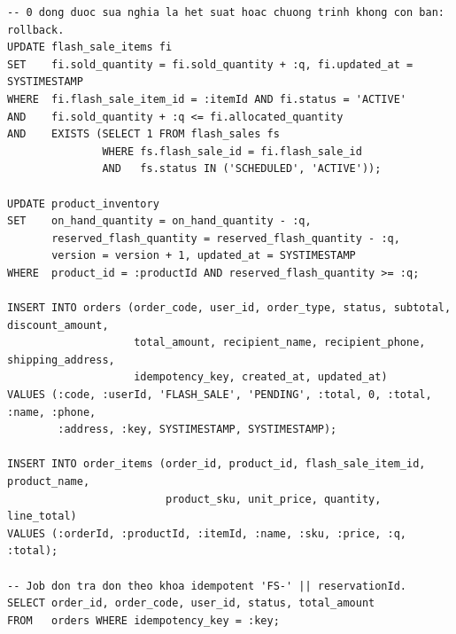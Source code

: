 \reportblockspace{72pt}
\begin{lstlisting}[language=OracleSQL, caption={Đặt đơn: tăng số đã bán và xuất kho bằng UPDATE có điều kiện trong một transaction}, label={lst:cc-dat-don}]
-- 0 dong duoc sua nghia la het suat hoac chuong trinh khong con ban: rollback.
UPDATE flash_sale_items fi
SET    fi.sold_quantity = fi.sold_quantity + :q, fi.updated_at = SYSTIMESTAMP
WHERE  fi.flash_sale_item_id = :itemId AND fi.status = 'ACTIVE'
AND    fi.sold_quantity + :q <= fi.allocated_quantity
AND    EXISTS (SELECT 1 FROM flash_sales fs
               WHERE fs.flash_sale_id = fi.flash_sale_id
               AND   fs.status IN ('SCHEDULED', 'ACTIVE'));

UPDATE product_inventory
SET    on_hand_quantity = on_hand_quantity - :q,
       reserved_flash_quantity = reserved_flash_quantity - :q,
       version = version + 1, updated_at = SYSTIMESTAMP
WHERE  product_id = :productId AND reserved_flash_quantity >= :q;

INSERT INTO orders (order_code, user_id, order_type, status, subtotal, discount_amount,
                    total_amount, recipient_name, recipient_phone, shipping_address,
                    idempotency_key, created_at, updated_at)
VALUES (:code, :userId, 'FLASH_SALE', 'PENDING', :total, 0, :total, :name, :phone,
        :address, :key, SYSTIMESTAMP, SYSTIMESTAMP);

INSERT INTO order_items (order_id, product_id, flash_sale_item_id, product_name,
                         product_sku, unit_price, quantity, line_total)
VALUES (:orderId, :productId, :itemId, :name, :sku, :price, :q, :total);

-- Job don tra don theo khoa idempotent 'FS-' || reservationId.
SELECT order_id, order_code, user_id, status, total_amount
FROM   orders WHERE idempotency_key = :key;
\end{lstlisting}

